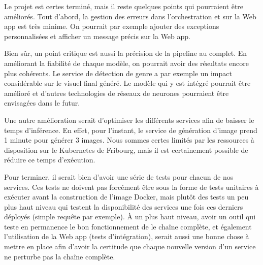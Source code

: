 Le projet est certes terminé, mais il reste quelques points qui pourraient être améliorés. Tout d'abord, la gestion des erreurs dans l'orchestration et sur la Web app est très minime. On pourrait par exemple ajouter des exceptions personnalisées et afficher un message précis sur la Web app.

Bien sûr, un point critique est aussi la précision de la pipeline au complet. En améliorant la fiabilité de chaque modèle, on pourrait avoir des résultats encore plus cohérents. Le service de détection de genre a par exemple un impact considérable sur le visuel final généré. Le modèle qui y est intégré pourrait être amélioré et d'autres technologies de réseaux de neurones pourraient être envisagées dans le futur.

Une autre amélioration serait d'optimiser les différents services afin de baisser le temps d'inférence. En effet, pour l'instant, le service de génération d'image prend 1 minute pour générer 3 images. Nous sommes certes limités par les ressources à disposition sur le Kubernetes de Fribourg, mais il est certainement possible de réduire ce temps d'exécution.

Pour terminer, il serait bien d'avoir une série de tests pour chacun de nos services. Ces tests ne doivent pas forcément être sous la forme de tests unitaires à exécuter avant la construction de l'image Docker, mais plutôt des tests un peu plus haut niveau qui testent la disponibilité des services une fois ces derniers déployés (simple requête par exemple). À un plus haut niveau, avoir un outil qui teste en permanence le bon fonctionnement de le chaîne complète, et également l'utilisation de la Web app (tests d'intégration), serait aussi une bonne chose à mettre en place afin d'avoir la certitude que chaque nouvelle version d'un service ne perturbe pas la chaîne complète.